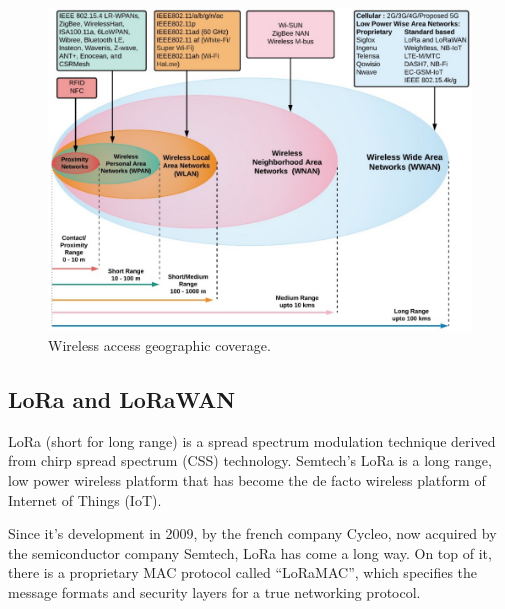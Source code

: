 		
		\begin{figure}
			\centering
			\includegraphics[width=\textheight,height=\textwidth,keepaspectratio,angle=90]{resources/img/iot_range}
			\caption[Wireless access geographic coverage.]{Wireless access geographic coverage. \cite{fi12030046}}
			\label{img:wireless_coverage}
		\end{figure}
	
		\subsection{LoRa and LoRaWAN}\label{subsec:lora_lorawan}
		
			LoRa (short for long range) is a spread spectrum modulation technique derived from chirp spread spectrum (CSS) technology.
			Semtech’s LoRa is a long range, low power wireless platform that has become the de facto wireless platform of Internet of Things (IoT).
			
			Since it's development in 2009, by the french company Cycleo, now acquired by the semiconductor company Semtech, LoRa has come a long way.				
			On top of it, there is a proprietary MAC protocol called “LoRaMAC”, which specifies the message formats and security layers for a true networking protocol.
			
